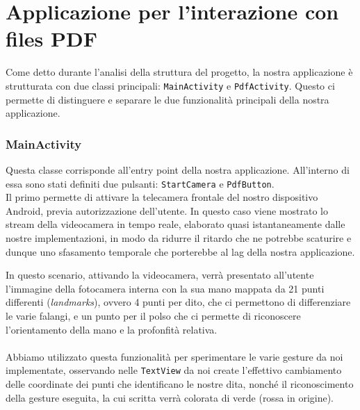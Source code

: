 \chapter{Applicazione per l'interazione con files PDF}

Come detto durante l'analisi della struttura del progetto, la nostra applicazione è strutturata con due classi principali: \texttt{MainActivity} e \texttt{PdfActivity}. Questo ci permette di distinguere e separare le due funzionalità principali della nostra applicazione.

\begin{figure}[H]
    \centering
\end{figure}


\subsection{MainActivity}
Questa classe corrisponde all'entry point della nostra applicazione. All'interno di essa sono stati definiti due pulsanti: \texttt{StartCamera} e \texttt{PdfButton}.\\
Il primo permette di attivare la telecamera frontale 
del nostro dispositivo Android, previa autorizzazione dell'utente. In questo caso viene mostrato lo 
stream della videocamera in tempo reale, elaborato quasi istantaneamente dalle nostre 
implementazioni, in modo da ridurre il ritardo che ne potrebbe scaturire e dunque uno sfasamento 
temporale che porterebbe al lag della nostra applicazione.
\begin{figure}[H]
    \centering
\end{figure}

\noindent In questo scenario, attivando la videocamera, verrà presentato all'utente l'immagine della fotocamera interna con la sua mano mappata da 21 punti 
differenti (\textit{landmarks}), ovvero 4 punti per dito, che ci permettono di differenziare le varie falangi, e un punto per 
il polso che ci permette di riconoscere l'orientamento della mano e la profonfità relativa.\\
\\
\noindent Abbiamo utilizzato questa funzionalità per sperimentare le varie gesture da noi implementate, osservando nelle \texttt{TextView} da noi create
l'effettivo cambiamento delle coordinate dei punti che identificano le nostre dita, nonché il 
riconoscimento della gesture eseguita, la cui scritta verrà colorata di verde (rossa in origine).


